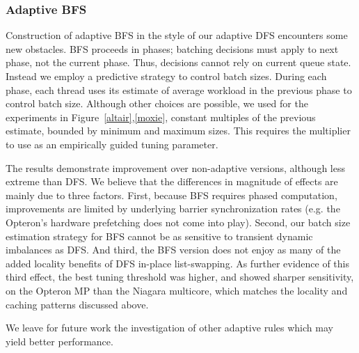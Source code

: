 \subsubsection{Adaptive BFS}

Construction of adaptive BFS in the style of our adaptive DFS
encounters some new obstacles.  BFS proceeds in phases; batching
decisions must apply to next phase, not the current phase. Thus,
decisions cannot rely on current queue state.  Instead we employ a
predictive strategy to control batch sizes. During each phase, each
thread uses its estimate of average workload in the previous phase to
control batch size. Although other choices are possible, we used for
the experiments in Figure~\ref{altair},\ref{moxie}, constant multiples of
the previous estimate, bounded by minimum and maximum sizes. This
requires the multiplier to use as an empirically guided tuning
parameter.

The results demonstrate improvement over non-adaptive versions,
although less extreme than DFS.  We believe that the differences in
magnitude of effects are mainly due to three factors. First, because
BFS requires phased computation, improvements are limited by
underlying barrier synchronization rates (e.g.{} the Opteron's hardware
prefetching does not come into play). Second, our batch size
estimation strategy for BFS cannot be as sensitive to transient
dynamic imbalances as DFS.  And third, the BFS version does not enjoy
as many of the added locality benefits of DFS in-place list-swapping.
As further evidence of this third effect, the best tuning threshold
was higher, and showed sharper sensitivity, on the Opteron MP than the
Niagara multicore, which matches the locality and caching patterns
discussed above.

We leave for future work the investigation of other adaptive rules which may yield better performance. 

